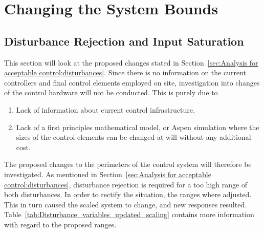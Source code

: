 \section{Changing the System Bounds}
\subsection{Disturbance Rejection and Input Saturation}

This section will look at the proposed changes stated in Section~\ref{sec:Analysis for acceptable control:disturbances}. Since there is no information on the current controllers and final control elements employed on site, investigation into changes of the control hardware will not be conducted. This is purely due to

\begin{enumerate}
	\item Lack of information about current control infrastructure. 
	\item Lack of a first principles mathematical model, or Aspen simulation where the sizes of the control elements can be changed at will without any additional cost.
\end{enumerate}

The proposed changes to the perimeters of the control system will therefore be investigated. As mentioned in Section~\ref{sec:Analysis for acceptable control:disturbances}, disturbance rejection is required for a too high range of both disturbances. In order to rectify the situation, the ranges where adjusted. This in turn caused the scaled system to change, and new responses resulted. Table~\ref{tab:Disturbance_variables_updated_scaling} contains more information with regard to the proposed ranges.

